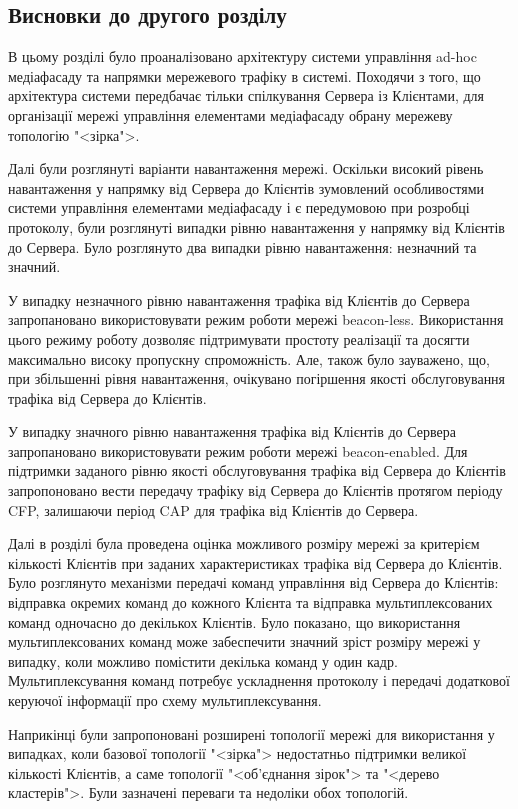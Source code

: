 \documentclass[a4paper,ukrainian,utf8,nocolumnsxix,floatsection,equationsection]{eskdtext}
\newcommand{\blm}[0]{beacon-less\xspace}
\newcommand{\bem}[0]{beacon-enabled\xspace}
\begin{document}
\subsection{Висновки до другого розділу}

В цьому розділі було проаналізовано архітектуру системи управління ad-hoc медіафасаду та напрямки мережевого трафіку в системі. Походячи з того, що архітектура системи передбачає тільки спілкування Сервера із Клієнтами, для організації мережі управління елементами медіафасаду обрану мережеву топологію "<зірка">.

Далі були розглянуті варіанти навантаження мережі. Оскільки високий рівень навантаження у напрямку від Сервера до Клієнтів зумовлений особливостями системи управління елементами медіафасаду і є передумовою при розробці протоколу, були розглянуті випадки рівню навантаження у напрямку від Клієнтів до Сервера. Було розглянуто два випадки рівню навантаження: незначний та значний.

У випадку незначного рівню навантаження трафіка від Клієнтів до Сервера запропановано використовувати режим роботи мережі \blm. Використання цього режиму роботу дозволяє підтримувати простоту реалізації та досягти максимально високу пропускну спроможність. Але, також було зауважено, що, при збільшенні рівня навантаження, очікувано погіршення якості обслуговування трафіка від Сервера до Клієнтів. 

У випадку значного рівню навантаження трафіка від Клієнтів до Сервера запропановано використовувати режим роботи мережі \bem. Для підтримки заданого рівню якості обслуговування трафіка від Сервера до Клієнтів запропоновано вести передачу трафіку від Сервера до Клієнтів протягом періоду CFP, залишаючи період CAP для трафіка від Клієнтів до Сервера.

Далі в розділі була проведена оцінка можливого розміру мережі за критерієм кількості Клієнтів при заданих характеристиках трафіка від Сервера до Клієнтів. Було розглянуто механізми передачі команд управління від Сервера до Клієнтів: відправка окремих команд до кожного Клієнта та відправка мультиплексованих команд одночасно до декількох Клієнтів. Було показано, що використання мультиплексованих команд може забеспечити значний зріст розміру мережі у випадку, коли можливо помістити декілька команд у один кадр. Мультиплексування команд потребує ускладнення протоколу і передачі додаткової керуючої інформації про схему мультиплексування.

Наприкінці були запропоновані розширені топології мережі для використання у випадках, коли базової топології "<зірка"> недостатньо підтримки великої кількості Клієнтів, а саме топології "<об’єднання зірок"> та "<дерево кластерів">. Були зазначені переваги та недоліки обох топологій.
\end{document}
